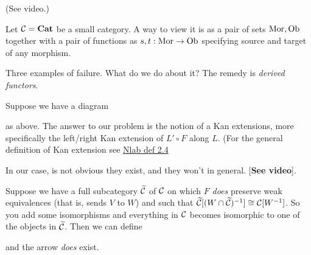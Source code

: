 \documentclass[class=report, crop=false,a4paper,twoside]{standalone}
\begin{document}
\begin{example}[(Limits)]

		

		

	(See video.)
\end{example}

\begin{example}
	Let $\mathcal{C} = \mathbf{Cat}$ be a small category. A way to view it is as a pair of sets $\operatorname{Mor},\operatorname{Ob}$ together with a pair of functions as $s,t: \operatorname{Mor} \to \operatorname{Ob}$ specifying source and target of any morphism.

	
		
\end{example}

Three examples of failure. What do we do about it? The remedy is \emph{derived functors}. 

Suppose we have a diagram
\begin{center}
\end{center}
as above. The answer to our problem is the notion of a Kan extensions, more specifically the left/right Kan extension of $L' \circ F$ along $L$.
(For the general definition of Kan extension see \href{https://ncatlab.org/nlab/show/Kan+extension}{Nlab def 2.4}

	


In our case, is not obvious they exist, and they won't in general. [\textbf{See video}]. 

Suppose we have a full subcategory $\widetilde{\mathcal{C}}$ of $\mathcal{C}$ on which $F$ \emph{does} preserve weak equivalences (that is, sends $V$ to $W$) and such that $\widetilde{\mathcal{C}}[(W \cap \widetilde{\mathcal{C}})^{-1}] \cong \mathcal{C}[W^{-1}]$. So you add some isomorphisms and everything in $\mathcal{C}$ becomes isomorphic to one of the objects in $\widetilde{\mathcal{C}}$. Then we can define
\begin{center}
\end{center}
and the arrow \emph{does} exist. 
\end{document}
